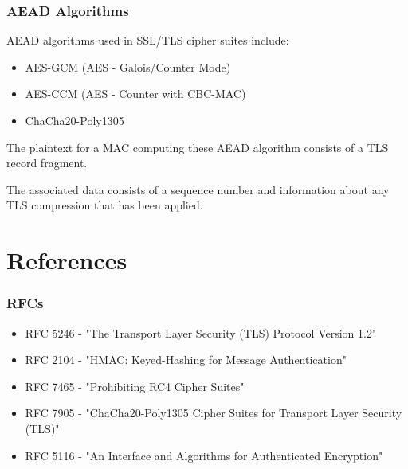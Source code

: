 \documentclass[aspectratio=169]{beamer}
\begin{document}
\begin{frame}[triangle=siiblue]
	\frametitle{AEAD Algorithms}
	AEAD algorithms used in SSL/TLS cipher suites include:
	\begin{itemize}
		\item AES-GCM (AES - Galois/Counter Mode)
		\item AES-CCM (AES - Counter with CBC-MAC)
		\item ChaCha20-Poly1305
	\end{itemize}

	\vfill
	
	The plaintext for a MAC computing these AEAD algorithm consists of a TLS record fragment.
	
	\vfill
	
	The associated data consists of a sequence number and information about any TLS compression that has been applied.
\end{frame}

\section{References}
\begin{frame}[Triangle=siiorange]
	\tocpage
\end{frame}

\begin{frame}[triangle=siiblue]
	\frametitle{RFCs}
	\begin{itemize}
		\item RFC 5246 - "The Transport Layer Security (TLS) Protocol Version 1.2"
		
		\vfill
				
		\item RFC 2104 - "HMAC: Keyed-Hashing for Message Authentication"

		\vfill
				
		\item RFC 7465 - "Prohibiting RC4 Cipher Suites"

		\vfill
				
		\item RFC 7905 - "ChaCha20-Poly1305 Cipher Suites for Transport Layer Security (TLS)"

		\vfill
				
		\item RFC 5116 - "An Interface and Algorithms for Authenticated Encryption"
	\end{itemize}
\end{frame}
\end{document}
